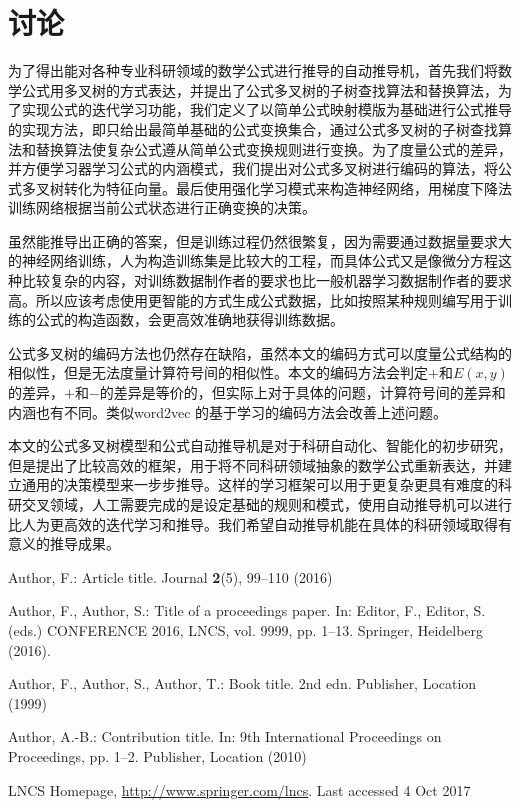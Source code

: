 \documentclass[runningheads]{llncs}
\begin{document}
\section{讨论}
为了得出能对各种专业科研领域的数学公式进行推导的自动推导机，首先我们将数学公式用多叉树的方式表达，并提出了公式多叉树的子树查找算法和替换算法，为了实现公式的迭代学习功能，我们定义了以简单公式映射模版为基础进行公式推导的实现方法，即只给出最简单基础的公式变换集合，通过公式多叉树的子树查找算法和替换算法使复杂公式遵从简单公式变换规则进行变换。为了度量公式的差异，并方便学习器学习公式的内涵模式，我们提出对公式多叉树进行编码的算法，将公式多叉树转化为特征向量。最后使用强化学习模式来构造神经网络，用梯度下降法训练网络根据当前公式状态进行正确变换的决策。

虽然能推导出正确的答案，但是训练过程仍然很繁复，因为需要通过数据量要求大的神经网络训练，人为构造训练集是比较大的工程，而具体公式又是像微分方程这种比较复杂的内容，对训练数据制作者的要求也比一般机器学习数据制作者的要求高。所以应该考虑使用更智能的方式生成公式数据，比如按照某种规则编写用于训练的公式的构造函数，会更高效准确地获得训练数据。

公式多叉树的编码方法也仍然存在缺陷，虽然本文的编码方式可以度量公式结构的相似性，但是无法度量计算符号间的相似性。本文的编码方法会判定$+$和$E(x,y)$的差异，$+$和$-$的差异是等价的，但实际上对于具体的问题，计算符号间的差异和内涵也有不同。类似word2vec \cite{ref_url1}的基于学习的编码方法会改善上述问题。

本文的公式多叉树模型和公式自动推导机是对于科研自动化、智能化的初步研究，但是提出了比较高效的框架，用于将不同科研领域抽象的数学公式重新表达，并建立通用的决策模型来一步步推导。这样的学习框架可以用于更复杂更具有难度的科研交叉领域，人工需要完成的是设定基础的规则和模式，使用自动推导机可以进行比人为更高效的迭代学习和推导。我们希望自动推导机能在具体的科研领域取得有意义的推导成果。










%
%




\begin{thebibliography}{8}
Author, F.: Article title. Journal \textbf{2}(5), 99--110 (2016)

Author, F., Author, S.: Title of a proceedings paper. In: Editor,
F., Editor, S. (eds.) CONFERENCE 2016, LNCS, vol. 9999, pp. 1--13.
Springer, Heidelberg (2016). 

Author, F., Author, S., Author, T.: Book title. 2nd edn. Publisher,
Location (1999)

Author, A.-B.: Contribution title. In: 9th International Proceedings
on Proceedings, pp. 1--2. Publisher, Location (2010)

LNCS Homepage, \url{http://www.springer.com/lncs}. Last accessed 4
Oct 2017

\end{thebibliography}


% 
% 
\end{document}
